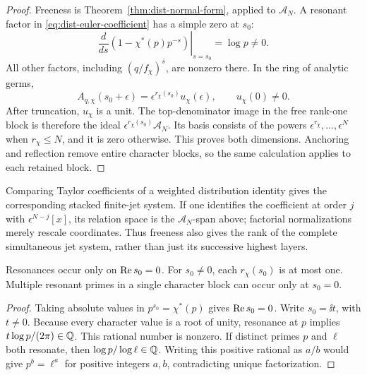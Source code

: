 \begin{proof}
Freeness is Theorem~\ref{thm:dist-normal-form}, applied to
\(\mathcal A_N\). A resonant factor in
\eqref{eq:dist-euler-coefficient} has a simple zero at \(s_0\):
\[
 \left.\frac{d}{ds}
 (1-\chi^*(p)p^{-s})\right|_{s=s_0}=\log p\ne0.
\]
All other factors, including \((q/f_\chi)^s\), are nonzero
there. In the ring of analytic germs,
\[
 A_{q,\chi}(s_0+\epsilon)
   =\epsilon^{r_\chi(s_0)}u_\chi(\epsilon),
 \qquad u_\chi(0)\ne0.
\]
After truncation, \(u_\chi\) is a unit. The
top-denominator image in the free rank-one block is therefore
the ideal \(\epsilon^{r_\chi(s_0)}\mathcal A_N\).
Its basis consists of the powers
\(\epsilon^{r_\chi},\ldots,\epsilon^N\) when \(r_\chi\leq N\),
and it is zero otherwise. This proves both dimensions.
Anchoring and reflection remove entire character blocks,
so the same calculation applies to each retained block.
\end{proof}

Comparing Taylor coefficients of a weighted distribution identity
gives the corresponding stacked finite-jet system. If one identifies
the coefficient at order \(j\) with
\(\epsilon^{N-j}[x]\), its relation space is the
\(\mathcal A_N\)-span above; factorial normalizations merely
rescale coordinates. Thus freeness also gives the rank of the
complete simultaneous jet system, rather than just its successive
highest layers.

\begin{proposition}
\label{prop:dist-resonance-multiplicity}
Resonances occur only on \(\operatorname{Re} s_0=0\).
For \(s_0\ne0\), each \(r_\chi(s_0)\) is at most one.
Multiple resonant primes in a single character block can occur
only at \(s_0=0\).
\end{proposition}

\begin{proof}
Taking absolute values in \(p^{s_0}=\chi^*(p)\) gives
\(\operatorname{Re} s_0=0\). Write \(s_0=\ii t\), with \(t\ne0\).
Because every character value is a root of unity, resonance
at \(p\) implies
\(t\log p/(2\pi)\in\mathbb{Q}\). This rational number is nonzero.
If distinct primes \(p\) and \(\ell\) both resonate, then
\(\log p/\log\ell\in\mathbb{Q}\). Writing this positive rational as
\(a/b\) would give \(p^b=\ell^a\) for positive integers \(a,b\),
contradicting unique factorization.
\end{proof}


